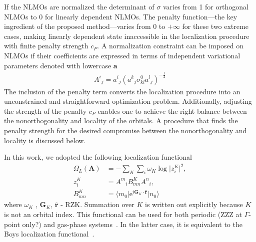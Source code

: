 \documentclass[aps,prl,reprint,amsmath,amssymb]{revtex4-1}
\newcommand*{\imi}{i} %
\newcommand*{\E}{\mathrm{e}}
\newcommand{\ket}[1]{\ensuremath{\vert #1 \rangle}}
\newcommand{\bra}[1]{\ensuremath{\langle #1 \vert}}
\newcommand{\op}[1]{\ensuremath{\hat{#1}}} %
\begin{document}
If the NLMOs are normalized the determinant of $\sigma$ varies from 1 for orthogonal NLMOs to 0 for linearly dependent NLMOs. The penalty function---the key ingredient of the proposed method---varies from 0 to $+\infty$ for these two extreme cases, making linearly dependent state inaccessible in the localization procedure with finite penalty strength $c_P$. 
A normalization constraint can be imposed on NLMOs if their coefficients are expressed in terms of independent variational parameters denoted with lowercase $\mathbf{a}$
%
\begin{equation}
\begin{split}
{A^i}_j = {a^i}_{j} ({a^k}_{j} \sigma^0_{kl}{a^l}_{j})^{-\frac{1}{2}}
\end{split}
\end{equation}
%
The inclusion of the penalty term converts the localization procedure into an unconstrained and straightforward optimization problem. Additionally, adjusting the strength of the penalty $c_P$ enables one to achieve the right balance between the nonorthogonality and locality of the orbitals. 
A procedure that finds the penalty strength for the desired compromise between the nonorthogonality and locality is discussed below. 

In this work, we adopted the following localization functional 
%
\begin{equation} \label{eq:fun-loc}
\begin{split}
\Omega_L(\mathbf{A}) &= - \sum_K \sum_i \omega_K \log \vert z_{i}^{K} \vert^2, \\
z_{i}^{K} &= {A^m}_i B^{K}_{mn} {A^n}_i, \\
B^{K}_{mn} &= \bra{m_0} \E^{\imi \mathbf{G}_K \cdot \mathbf{\op{r}}} \ket{n_0}
\end{split}
\end{equation}
%
where $\omega_K$ , $\mathbf{G}_K$, $\mathbf{\op{r}}$ - RZK. Summation over $K$ is written out explicitly because $K$ is not an orbital index. This functional can be used for both periodic (ZZZ at $\Gamma$-point only?) and gas-phase systems~\cite{berghold2000general}. In the latter case, it is equivalent to the Boys localization functional~\cite{RZK}.
\end{document}
